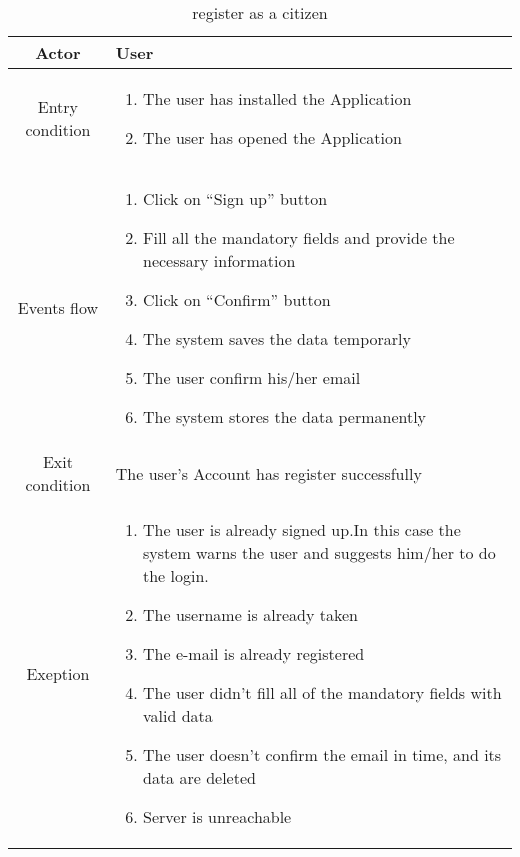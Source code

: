 \documentclass{article}
\begin{document}
		\begin{table} [H]
		\begin{center}
		\caption{register as a citizen}
		\begin{tabular}{|c|p{8cm}|}
			\hline
			Actor&User\\
			\hline
			Entry condition & \begin{enumerate}
								\item The user has installed the Application
								\item The user has opened the Application
							\end{enumerate}\\
			\hline
			Events flow & \begin{enumerate}
							\item Click on “Sign up” button
							\item Fill all the mandatory fields and provide the necessary information
							\item Click on “Confirm” button
							\item The system saves the data temporarly
							\item The user confirm his/her email
							\item The system stores the data permanently
							
						\end{enumerate}\\
			\hline
			Exit condition & The user's Account has register successfully\\
			\hline
			Exeption & \begin{enumerate}
							\item The user is already signed up.In this case the system warns the user and suggests him/her to do the login.
							\item The username is already taken
							\item The e-mail is already registered
							\item The user didn’t fill all of the mandatory fields with valid data
							\item The user doesn't confirm the email in time, and its data are deleted
							\item Server is unreachable
						\end{enumerate}\\
			\hline
		\end{tabular}	
		\end{center}
		\end{table} 
\end{document}
